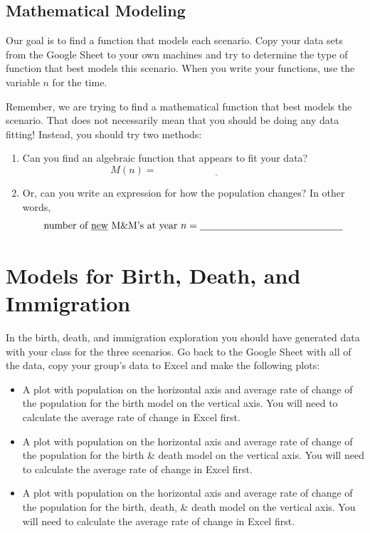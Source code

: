 \subsection*{Mathematical Modeling}
Our goal is to find a function that models each scenario. Copy your data sets from the
Google Sheet to your own machines and try to determine the type of function that best
models this scenario.  When you write your functions, use the variable $n$ for the time.  

Remember, we are trying to find a mathematical function that best models the scenario.
That does not necessarily mean that you should be doing any data fitting!  
Instead, you should try two methods:
\begin{enumerate}
    \item Can you find an algebraic function that appears to fit your data?
        \[ M(n) = \underline{\hspace{2in}} \]
    \item Or, can you write an expression for
        how the population changes? In other words,
        \[ \text{number of \underline{new} M\&M's at year $n$} = \underline{\hspace{2in}} \]
\end{enumerate}


\section{Models for Birth, Death, and Immigration}
\begin{problem}
    In the birth, death, and immigration exploration you should have generated data with your
    class for the three scenarios. Go back to the Google Sheet with all of the data, copy
    your group's data to Excel and make the following plots:
    \begin{itemize}
        \item A plot with population on the horizontal axis and average rate of change of the
            population for the birth model on the vertical axis.  You will need to
            calculate the average rate of change in Excel first.
        \item A plot with population on the horizontal axis and average rate of change of the
            population for the birth \& death model on the vertical axis.  You will need
            to calculate the average rate of change in Excel first.
        \item A plot with population on the horizontal axis and average rate of change of the
            population for the birth, death, \& death model on the vertical axis.  You
            will need to calculate the average rate of change in Excel first.
    \end{itemize}
\end{problem}

